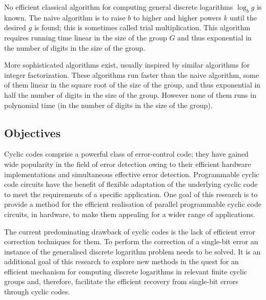 \documentclass[a4paper, 11pt]{article}
\begin{document}
No efficient classical algorithm for computing general discrete logarithms $\log _b g$ is known. The naive algorithm is to raise $b$ to higher and higher powers $k$ until the desired $g$ is found; this is sometimes called trial multiplication. This algorithm requires running time linear in the size of the group $G$ and thus exponential in the number of digits in the size of the group.

More sophisticated algorithms exist, usually inspired by similar algorithms for integer factorization. These algorithms run faster than the naive algorithm, some of them linear in the square root of the size of the group, and thus exponential in half the number of digits in the size of the group. However none of them runs in polynomial time (in the number of digits in the size of the group).

\subsection{Objectives}
Cyclic codes comprise a powerful class of error-control code; they have gained wide popularity in the field of error detection owing to their efficient hardware implementations and simultaneous effective error detection. Programmable cyclic code circuits have the benefit of flexible adaptation of the underlying cyclic code to meet the requirements of a specific application. One goal of this research is to provide a method for the efficient realisation of parallel programmable cyclic code circuits, in hardware, to make them appealing for a wider range of applications.

The current predominating drawback of cyclic codes is the lack of efficient error correction techniques for them. To perform the correction of a single-bit error an instance of the generalised discrete logarithm problem needs to be solved. It is an additional goal of this research to explore new methods in the quest for an efficient mechanism for computing discrete logarithms in relevant finite cyclic groups and, therefore, facilitate the efficient recovery from single-bit errors through cyclic codes.
\end{document}
